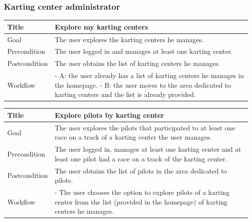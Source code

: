 \documentclass{beamer}
\begin{document}
\begin{frame}
    \frametitle{Karting center administrator}
    \begin{table}
        \tiny
        \begin{tabular}{|p{2cm}|p{6cm}|}
        \hline  
        Title & \textbf{Explore my karting centers} \\
        \hline
        Goal & The user explores the karting centers he manages. \\
        \hline
        Precondition & The user logged in and manages at least one karting center.\\
        \hline
        Postcondition & The user obtains the list of karting centers he manages. \\
        \hline
        Workflow &
        - A: the user already has a list of karting centers he manages in the homepage. \newline
        - B: the user moves to the area dedicated to karting centers and the list is already provided. \\
        \hline
        \end{tabular}
\end{table}

\begin{table}
    \tiny
    \begin{tabular}{|p{2cm}|p{6cm}|}
    \hline  
    Title & \textbf{Explore pilots by karting center} \\
    \hline
    Goal & The user explores the pilots that participated to at
    least one race on a track of a karting center the user manages. \\
    \hline
    Precondition & The user logged in, manages at least one karting center and at least one pilot
    had a race on a track of the karting center.\\
    \hline
    Postcondition & The user obtains the list of pilots in the area dedicated to pilots. \\
    \hline
    Workflow &
    - The user chooses the option to explore pilots of a karting center 
    from the list (provided in the homepage) of karting centers he manages. \\
    \hline
    \end{tabular}
\end{table}


\end{frame}
\end{document}
